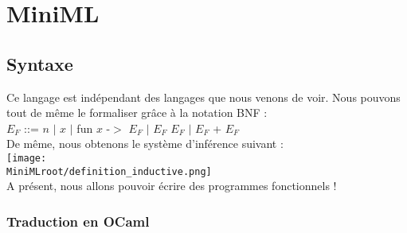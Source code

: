 \chapter{MiniML}

		\section{Syntaxe}
Ce langage est indépendant des langages que nous venons de voir. Nous pouvons tout de même le formaliser grâce à la notation BNF : \\
$E_F$ ::= $n$ $|$ $x$ $|$ fun $x$ -$>$ $E_F$ $|$ $E_F$ $E_F$ $|$ $E_F$ + $E_F$
\vspace{1\baselineskip} \\
De même, nous obtenons le système d'inférence suivant : \\
\texttt{[image: \\MiniMLroot/definition\_inductive.png]} \\
A présent, nous allons pouvoir écrire des programmes fonctionnels !

	\subsection{Traduction en OCaml}


























